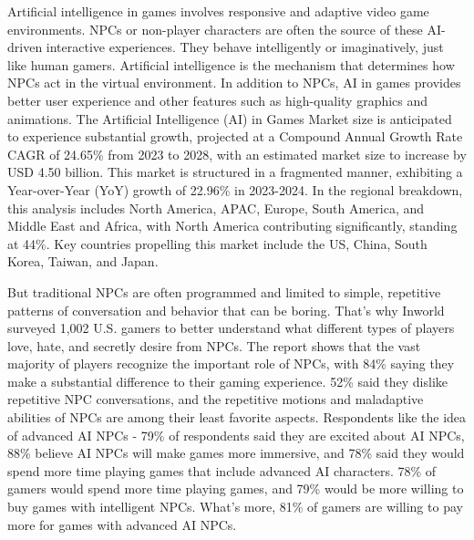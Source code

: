 Artificial intelligence in games involves responsive and adaptive video game environments. 
NPCs or non-player characters are often the source of these AI-driven interactive experiences. 
They behave intelligently or imaginatively, just like human gamers. Artificial intelligence is the mechanism that determines how NPCs act in the virtual environment. 
In addition to NPCs, AI in games provides better user experience and other features such as high-quality graphics and animations.
The Artificial Intelligence (AI) in Games Market size is anticipated to experience substantial growth, projected at a Compound Annual Growth Rate CAGR of 24.65\% from 2023 to 2028, with an estimated market size to increase by USD 4.50 billion. 
This market is structured in a fragmented manner, exhibiting a Year-over-Year (YoY) growth of 22.96\% in 2023-2024. 
In the regional breakdown, this analysis includes North America, APAC, Europe, South America, and Middle East and Africa, with North America contributing significantly, standing at 44\%. 
Key countries propelling this market include the US, China, South Korea, Taiwan, and Japan\cite{AIGAME_Market_research}. 

But traditional NPCs are often programmed and limited to simple, repetitive patterns of conversation and behavior that can be boring.
That's why Inworld surveyed 1,002 U.S. gamers to better understand what different types of players love, hate, and secretly desire from NPCs. 
The report\cite{Inworld_Research} shows that the vast majority of players recognize the important role of NPCs, with 84\% saying they make a substantial difference to their gaming experience. 
52\% said they dislike repetitive NPC conversations, and the repetitive motions and maladaptive abilities of NPCs are among their least favorite aspects. Respondents like the idea of advanced AI NPCs - 79\% of respondents said they are excited about AI NPCs, 88\% believe AI NPCs will make games more immersive, and 78\% said they would spend more time playing games that include advanced AI characters. 
78\% of gamers would spend more time playing games, and 79\% would be more willing to buy games with intelligent NPCs. What's more, 81\% of gamers are willing to pay more for games with advanced AI NPCs. 

